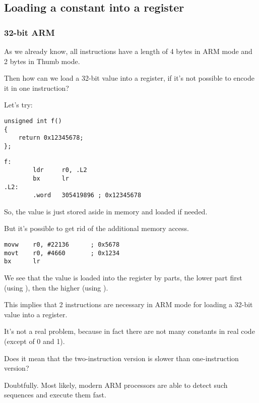 ﻿\subsection{Loading a constant into a register}
\label{ARM_big_constants}

\subsubsection{32-bit ARM}
\label{ARM_big_constants_loading}

As we already know, all instructions have a length of 4 bytes in ARM mode and 2 bytes in Thumb mode.

Then how can we load a 32-bit value into a register, if it's not possible to encode it in one instruction?

Let's try:

\begin{lstlisting}[style=customc]
unsigned int f()
{
	return 0x12345678;
};
\end{lstlisting}

\begin{lstlisting}[caption=GCC 4.6.3 -O3 \ARMMode,style=customasmARM]
f:
        ldr     r0, .L2
        bx      lr
.L2:
        .word   305419896 ; 0x12345678
\end{lstlisting}

So, the  value is just stored aside in memory and loaded if needed.

But it's possible to get rid of the additional memory access.

\begin{lstlisting}[caption=GCC 4.6.3 -O3 -march{=}armv7-a (\ARMMode),style=customasmARM]
movw    r0, #22136      ; 0x5678
movt    r0, #4660       ; 0x1234
bx      lr
\end{lstlisting}

We see that the value is loaded into the register by parts, the lower part first (using ), 
then the higher (using ).

This implies that 2 instructions are necessary in ARM mode for loading a 32-bit value into a register.

It's not a real problem, because in fact there are not many constants in real code (except of 0 and 1).

Does it mean that the two-instruction version is slower than one-instruction version?

Doubtfully. Most likely, modern ARM processors are able to detect such sequences and execute
them fast.


